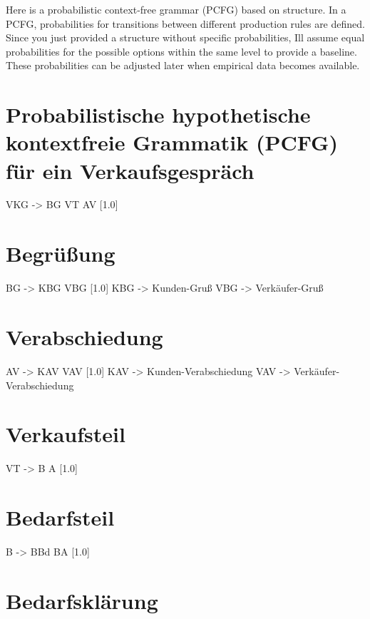 \documentclass[
]{article}
\begin{document}
Here is a probabilistic context-free grammar (PCFG) based on structure.
In a PCFG, probabilities for transitions between different production
rules are defined. Since you just provided a structure without specific
probabilities, I\textquotesingle ll assume equal probabilities for the
possible options within the same level to provide a baseline. These
probabilities can be adjusted later when empirical data becomes
available.

\section{Probabilistische hypothetische kontextfreie Grammatik (PCFG)
für ein
Verkaufsgespräch}\label{probabilistische-hypothetische-kontextfreie-grammatik-pcfg-fuxfcr-ein-verkaufsgespruxe4ch}

VKG -\textgreater{} BG VT AV {[}1.0{]}

\section{Begrüßung}\label{begruxfcuxdfung}

BG -\textgreater{} KBG VBG {[}1.0{]} KBG -\textgreater{}
\textquotesingle Kunden-Gruß\textquotesingle{} VBG -\textgreater{}
\textquotesingle Verkäufer-Gruß\textquotesingle{}

\section{Verabschiedung}\label{verabschiedung}

AV -\textgreater{} KAV VAV {[}1.0{]} KAV -\textgreater{}
\textquotesingle Kunden-Verabschiedung\textquotesingle{} VAV
-\textgreater{}
\textquotesingle Verkäufer-Verabschiedung\textquotesingle{}

\section{Verkaufsteil}\label{verkaufsteil}

VT -\textgreater{} B A {[}1.0{]}

\section{Bedarfsteil}\label{bedarfsteil}

B -\textgreater{} BBd BA {[}1.0{]}

\section{Bedarfsklärung}\label{bedarfskluxe4rung}
\end{document}
